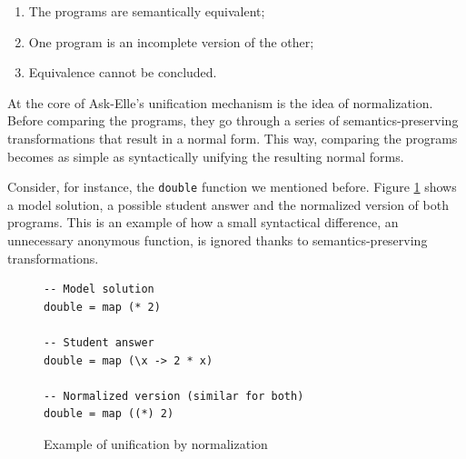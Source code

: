\begin{enumerate}
    \item The programs are semantically equivalent;
    \item One program is an incomplete version of the other;
    \item Equivalence cannot be concluded.
\end{enumerate}

At the core of Ask-Elle's unification mechanism is the idea of normalization. Before comparing the programs, they go through a series of semantics-preserving transformations that result in a normal form. This way, comparing the programs becomes as simple as syntactically unifying the resulting normal forms.

Consider, for instance, the \texttt{double} function we mentioned before. Figure \ref{fig:bg-unification-normalization} shows a model solution, a possible student answer and the normalized version of both programs. This is an example of how a small syntactical difference, an unnecessary anonymous function, is ignored thanks to semantics-preserving transformations.

\begin{figure}[H]
\begin{verbatim}
-- Model solution
double = map (* 2)

-- Student answer
double = map (\x -> 2 * x)

-- Normalized version (similar for both)
double = map ((*) 2)
\end{verbatim}
\caption{Example of unification by normalization}
\label{fig:bg-unification-normalization}
\end{figure}
